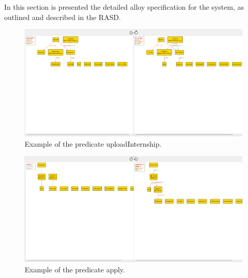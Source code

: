 In this section is presented the detailed alloy specification for the system, as outlined and described in the RASD. \\


\newpage

\begin{figure}[H]
    \begin{center}
        \includegraphics[width=\linewidth]{Images/Alloy/uploadInternship.png}
        \caption{Example of the predicate uploadInternship.}
        \label{fig:upload_intern_alloy}%
    \end{center}
\end{figure}

\begin{figure}[H]
    \begin{center}
        \includegraphics[width=\linewidth]{Images/Alloy/apply.png}
        \caption{Example of the predicate apply.}
        \label{fig:apply_alloy}%
    \end{center}
\end{figure}


